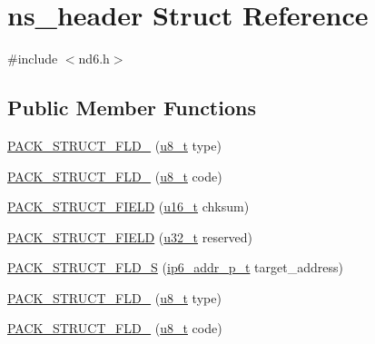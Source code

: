 \hypertarget{structns__header}{}\section{ns\+\_\+header Struct Reference}
\label{structns__header}


{\ttfamily \#include $<$nd6.\+h$>$}

\subsection*{Public Member Functions}
\begin{DoxyCompactItemize}
\item 
\hyperlink{structns__header_a234eadacec43dbdebad4f4a2bad4d737}{P\+A\+C\+K\+\_\+\+S\+T\+R\+U\+C\+T\+\_\+\+F\+L\+D\+\_} (\hyperlink{group__compiler__abstraction_ga4caecabca98b43919dd11be1c0d4cd8e}{u8\+\_\+t} type)
\item 
\hyperlink{structns__header_a24242894e6f1324a608b942c987f9992}{P\+A\+C\+K\+\_\+\+S\+T\+R\+U\+C\+T\+\_\+\+F\+L\+D\+\_} (\hyperlink{group__compiler__abstraction_ga4caecabca98b43919dd11be1c0d4cd8e}{u8\+\_\+t} code)
\item 
\hyperlink{structns__header_a8b960b87442f2197345dcb017490458c}{P\+A\+C\+K\+\_\+\+S\+T\+R\+U\+C\+T\+\_\+\+F\+I\+E\+LD} (\hyperlink{group__compiler__abstraction_ga77570ac4fcab86864fa1916e55676da2}{u16\+\_\+t} chksum)
\item 
\hyperlink{structns__header_ac7f435b2b9fc1cedabca99289e055a7c}{P\+A\+C\+K\+\_\+\+S\+T\+R\+U\+C\+T\+\_\+\+F\+I\+E\+LD} (\hyperlink{group__compiler__abstraction_ga4c14294869aceba3ef9d4c0c302d0f33}{u32\+\_\+t} reserved)
\item 
\hyperlink{structns__header_a9afca416f5a3caff1d19744d8f89a571}{P\+A\+C\+K\+\_\+\+S\+T\+R\+U\+C\+T\+\_\+\+F\+L\+D\+\_\+S} (\hyperlink{native_2lwip_2src_2include_2lwip_2prot_2ip6_8h_a560932a657f17ec5a0a3a78a1ce7e60a}{ip6\+\_\+addr\+\_\+p\+\_\+t} target\+\_\+address)
\item 
\hyperlink{structns__header_a234eadacec43dbdebad4f4a2bad4d737}{P\+A\+C\+K\+\_\+\+S\+T\+R\+U\+C\+T\+\_\+\+F\+L\+D\+\_} (\hyperlink{group__compiler__abstraction_ga4caecabca98b43919dd11be1c0d4cd8e}{u8\+\_\+t} type)
\item 
\hyperlink{structns__header_a24242894e6f1324a608b942c987f9992}{P\+A\+C\+K\+\_\+\+S\+T\+R\+U\+C\+T\+\_\+\+F\+L\+D\+\_} (\hyperlink{group__compiler__abstraction_ga4caecabca98b43919dd11be1c0d4cd8e}{u8\+\_\+t} code)
\item 

\end{DoxyCompactItemize}
